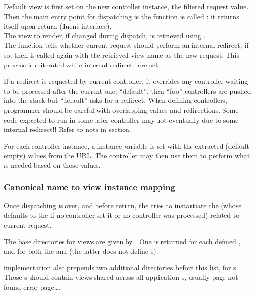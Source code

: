 \documentclass[pdftex,12pt,a4paper]{article}
\begin{document}
Default view  is first set on the new controller instance, \ie the filtered request value. Then the  main entry point for dispatching is the function  is called : it returns itself upon return (fluent interface). \\
The view to render, if changed during dispatch, is retrieved using .\\
The function  tells whether current request should perform an internal redirect; if so, then  is called again with the retrieved view name as the new request. This process is reiterated while internal redirects are set.
\begin{note}
If a redirect is requested by current controller, it overrides any controller waiting to be processed after the current one; \eg{} ``default'', then ``foo'' controllers are pushed into the stack but ``default'' asks for a redirect. When defining controllers, programmer should be careful with overlapping values and redirections. Some code expected to run in some later controller may not eventually due to some internal redirect!! Refer to note in  section.
\end{note}
For each controller instance, a  instance variable is set with the extracted (default empty) values from the URL. The controller may then use them to perform what is needed based on those values.

\subsubsection{Canonical name to view instance mapping} \label{sec:canonical-name-to-view-instance-mapping}

Once dispatching is over, and before return, the  tries to instantiate the  (whose  defaults to the   if no controller set it or no controller was processed) related to current request.

The base directories for views are given by . One is returned for each defined , and for both the  and  (the latter does not define s).

 implementation also prepends two additional directories before this list, for s.\\
Those s should contain views shared across all application s, usually  page not found error page\ldots.
\end{document}
